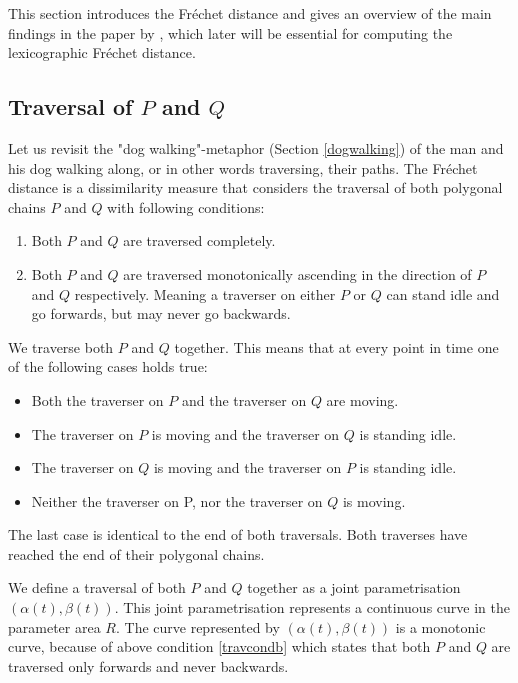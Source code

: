 This section introduces the Fréchet distance and gives an overview of the main  findings in the \citeyear{altgodau} paper  by \citeauthor*{altgodau}\cite{altgodau}, which later will be essential for computing the lexicographic Fréchet distance.

\subsection{Traversal of $P$ and $Q$}

Let us revisit the "dog walking"-metaphor (Section \ref{dogwalking}) of the man and his dog walking along, or in other words traversing, their paths. The Fréchet distance is a dissimilarity measure that considers the traversal of both polygonal chains $P$ and $Q$ with following conditions:
\begin{enumerate}[label=(\Alph*)]
	\item Both $P$ and $Q$ are traversed completely.
	\item Both $P$ and $Q$ are traversed monotonically ascending in the direction of $P$ and $Q$ respectively. Meaning a traverser on either $P$ or $Q$ can stand idle and go forwards, but may never go backwards.\label{travcondb}
\end{enumerate}

We traverse both $P$ and $Q$ together. This means that at every point in time one of the following cases holds true:
\begin{itemize}
	\item Both the traverser on $P$ and the traverser on $Q$ are moving.
	\item The traverser on $P$ is moving and the traverser on $Q$ is standing idle.
	\item The traverser on $Q$ is moving and the traverser on $P$ is standing idle.
	\item Neither the traverser on P, nor the traverser on $Q$ is moving.
\end{itemize}

The last case is identical to the end of both traversals. Both traverses have reached the end of their polygonal chains.

We define a traversal of both $P$ and $Q$ together as a joint parametrisation $(\alpha(t), \beta(t))$. This joint parametrisation represents a continuous curve in the parameter area $R$. The curve represented by $(\alpha(t), \beta(t))$ is a monotonic curve, because of above condition \ref{travcondb} which states that both $P$ and $Q$ are traversed only forwards and never backwards.

